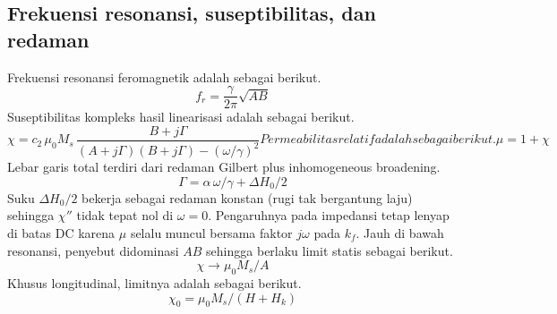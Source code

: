 \documentclass[a4paper,11pt]{article}
\begin{document}
\subsection{Frekuensi resonansi, suseptibilitas, dan redaman}
Frekuensi resonansi feromagnetik adalah sebagai berikut.
\begin{equation}
f_{r} = \frac{\gamma}{2\pi}\sqrt{AB}
\label{eq:9}
\end{equation}
Suseptibilitas kompleks hasil linearisasi adalah sebagai berikut.
\begin{subequations}\label{eq:10}
\begin{equation}
\chi = c_{2}\,\mu_{0}M_{s}\,
\frac{B+j\Gamma}{(A+j\Gamma)(B+j\Gamma)-(\omega/\gamma)^{2}}
\label{eq:10a}
\end{equation}
Permeabilitas relatif adalah sebagai berikut.
\begin{equation}
\mu = 1+\chi
\label{eq:10b}
\end{equation}
\end{subequations}
Lebar garis total terdiri dari redaman Gilbert plus inhomogeneous broadening.
\begin{equation}
\Gamma = \alpha\,\omega/\gamma+\Delta H_{0}/2
\label{eq:11}
\end{equation}
Suku $\Delta H_{0}/2$ bekerja sebagai redaman konstan (rugi tak bergantung laju)
sehingga $\chi''$ tidak tepat nol di $\omega=0$. Pengaruhnya pada impedansi tetap
lenyap di batas DC karena $\mu$ selalu muncul bersama faktor $j\omega$ pada $k_{f}$.
Jauh di bawah resonansi, penyebut didominasi $AB$ sehingga berlaku limit
statis sebagai berikut.
\begin{equation*}
\chi \to \mu_{0}M_{s}/A
\end{equation*}
Khusus longitudinal, limitnya adalah sebagai berikut.
\begin{equation*}
\chi_{0} = \mu_{0}M_{s}/(H+H_{k})
\end{equation*}
\end{document}

